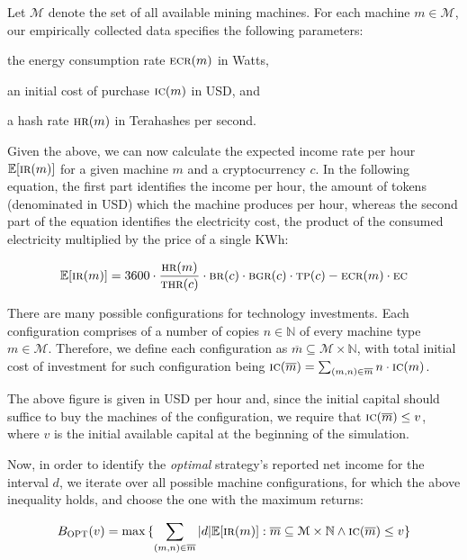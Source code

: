 
Let $\mathcal{M}$ denote the set of
all available mining machines. For each machine $m \in \mathcal{M}$, our empirically
collected data specifies the following parameters:
\begin{inparaenum}[i)]
    \item the energy consumption rate $\textsc{ecr}(m)$ in Watts,
    \item an initial cost of purchase $\textsc{ic}(m)$ in USD, and
    \item a hash rate $\textsc{hr}(m)$ in Terahashes per second.
\end{inparaenum}
Given the above, we can now calculate the expected income rate per hour
$\mathbb{E}[\textsc{ir}(m)]$ for a given machine $m$ and a cryptocurrency $c$. In the
following equation, the first part identifies the income per hour, \ie the
amount of tokens (denominated in USD) which the machine produces per hour,
whereas the second part of the equation identifies the electricity cost, \ie
the product of the consumed electricity multiplied by the price of a single
KWh:

\[
\mathbb{E}[\textsc{ir}(m)] = 3600 \cdot \frac{\textsc{hr}(m)}{\textsc{thr}(c)} \cdot \textsc{br}(c) \cdot \textsc{bgr}(c) \cdot \textsc{tp}(c) - \textsc{ecr}(m) \cdot \textsc{ec}
\]

There are many possible configurations for technology investments. Each
configuration comprises of a number of copies $n \in \mathbb{N}$ of every
machine type $m \in \mathcal{M}$. Therefore, we define each configuration as
$\overline{m} \subseteq \mathcal{M} \times \mathbb{N}$, with
total initial cost of investment for such configuration being
$\textsc{ic}(\overline{m}) = \sum_{(m, n) \in \overline{m}}{n \cdot \textsc{ic}(m)}$.

The above figure is given in USD per hour and, since the initial capital should
suffice to buy the machines of the configuration, we require that
$\textsc{ic}(\overline{m}) \leq v$,
where $v$ is the initial available capital at the beginning of the simulation.

Now, in order to identify the \emph{optimal} strategy's reported net income for the
interval $d$, we iterate over all possible machine configurations, for which
the above inequality holds, and choose the one with the maximum returns:

\[
  B_\textsc{OPT}(v)
  =
  \max{
    \{
      \sum_{(m, n) \in \overline{m}}
      {|d|\mathbb{E}[\textsc{ir}(m)]}:
      \overline{m} \subseteq \mathcal{M} \times \mathbb{N}
      \land
      \textsc{ic}(\overline{m}) \leq v
    \}
  }
\]

